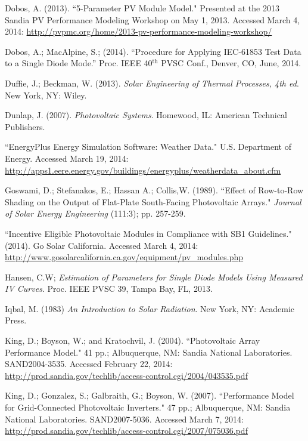 \documentclass[12pt,letterpaper]{article}
\begin{document}
\begin{thebibliography}{99}
 Dobos, A. (2013). ``5-Parameter PV Module Model." Presented at the 2013 Sandia PV Performance Modeling Workshop on May 1, 2013. Accessed March 4, 2014: \url{http://pvpmc.org/home/2013-pv-performance-modeling-workshop/}

 Dobos, A.; MacAlpine, S.; (2014). ``Procedure for Applying IEC-61853 Test Data to a Single Diode Mode.'' Proc. IEEE 40$^{\mbox{th}}$ PVSC Conf., Denver, CO, June, 2014.

 Duffie, J.; Beckman, W. (2013). \textit{Solar Engineering of Thermal Processes, 4th ed}. New York, NY: Wiley.

 Dunlap, J. (2007). \textit{Photovoltaic Systems}. Homewood, IL: American Technical Publishers.

 ``EnergyPlus Energy Simulation Software: Weather Data." U.S. Department of Energy. Accessed March 19, 2014: \url{http://apps1.eere.energy.gov/buildings/energyplus/weatherdata_about.cfm}

 Goswami, D.; Stefanakos, E.; Hassan A.; Collis,W. (1989). ``Effect of Row-to-Row Shading on the Output of Flat-Plate South-Facing Photovoltaic Arrays." \textit{Journal of Solar Energy Engineering} (111:3); pp. 257-259.

 ``Incentive Eligible Photovoltaic Modules in Compliance with SB1 Guidelines." (2014). Go Solar California. Accessed March 4, 2014: \url{http://www.gosolarcalifornia.ca.gov/equipment/pv_modules.php}

 Hansen, C.W; \emph{Estimation of Parameters for Single Diode Models Using Measured IV Curves}. Proc. IEEE PVSC 39, Tampa Bay, FL, 2013.

 Iqbal, M. (1983) \textit{An Introduction to Solar 
Radiation}. New York, NY: Academic Press.

  King, D.; Boyson, W.; and Kratochvil, J. (2004). ``Photovoltaic Array Performance Model." 41 pp.; Albuquerque, NM: Sandia National Laboratories. SAND2004-3535. Accessed February 22, 2014: \url{http://prod.sandia.gov/techlib/access-control.cgi/2004/043535.pdf}

 King, D.; Gonzalez, S.; Galbraith, G.; Boyson, W. (2007). ``Performance Model for Grid-Connected Photovoltaic Inverters." 47 pp.; Albuquerque, NM: Sandia National Laboratories. SAND2007-5036. Accessed March 7, 2014: \url{http://prod.sandia.gov/techlib/access-control.cgi/2007/075036.pdf}


\end{thebibliography}
\end{document}
